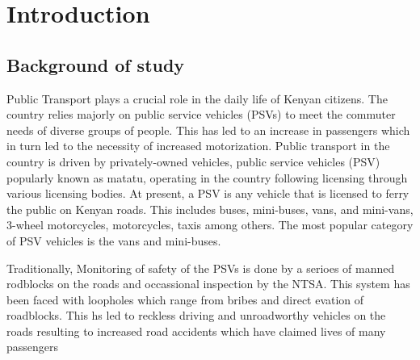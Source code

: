 \documentclass[a4paper, 12pt]{report}
\begin{document}
\chapter{Introduction}
\section{Background of study}
\noindent Public Transport plays a crucial role in the daily life of Kenyan citizens. The country relies majorly on public service vehicles (PSVs) to meet the commuter needs of
diverse groups of people. This has led to an increase in passengers which in turn
led to the necessity of increased motorization. Public transport in the country is
driven by privately-owned vehicles, public service vehicles (PSV) popularly known
as matatu, operating in the country following licensing through various licensing
bodies. At present, a PSV is any vehicle that is licensed to ferry the public on
Kenyan roads. This includes buses, mini-buses, vans, and mini-vans, 3-wheel motorcycles, motorcycles, taxis among others. The most popular category of PSV
vehicles is the vans and mini-buses.\par
\noindent Traditionally, Monitoring of safety of the PSVs is done by a serioes of manned
rodblocks on the roads and occassional inspection by the NTSA. This system has
been faced with loopholes which range from bribes and direct evation of roadblocks. This hs led to reckless driving and unroadworthy vehicles on the roads
resulting to increased road accidents which have claimed lives of many passengers
\end{document}
